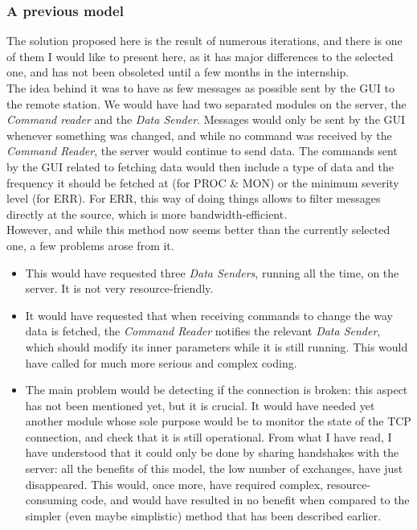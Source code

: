 \documentclass{themeensg}
\begin{document}
\subsubsection{A previous model}

The solution proposed here is the result of numerous iterations, and there is one of them I would like to present here, as it has major differences to the selected one, and has not been obsoleted until a few months in the internship.\\

The idea behind it was to have as few messages as possible sent by the GUI to the remote station. We would have had two separated modules on the server, the \textit{Command reader} and the \textit{Data Sender}.
Messages would only be sent by the GUI whenever something was changed, and while no command was received by the \textit{Command Reader}, the server would continue to send data. The commands sent by the GUI related to fetching data would then include a type of data and the frequency it should be fetched at (for PROC \& MON) or the minimum severity level (for ERR). For ERR, this way of doing things allows to filter messages directly at the source, which is more bandwidth-efficient.\\

However, and while this method now seems better than the currently selected one, a few problems arose from it.\begin{itemize}
\item This would have requested three \textit{Data Senders}, running all the time, on the server. It is not very resource-friendly.
\item It would have requested that when receiving commands to change the way data is fetched, the \textit{Command Reader} notifies the relevant \textit{Data Sender}, which should modify its inner parameters while it is still running. This would have called for much more serious and complex coding.
\item The main problem would be detecting if the connection is broken: this aspect has not been mentioned yet, but it is crucial. It would have needed yet another module whose sole purpose would be to monitor the state of the TCP connection, and check that it is still operational. From what I have read, I have understood that it could only be done by sharing handshakes with the server: all the benefits of this model, the low number of exchanges, have just disappeared. This would, once more, have required complex, resource-consuming code, and would have resulted in no benefit when compared to the simpler (even maybe simplistic) method that has been described earlier.
\end{itemize}
\end{document}
